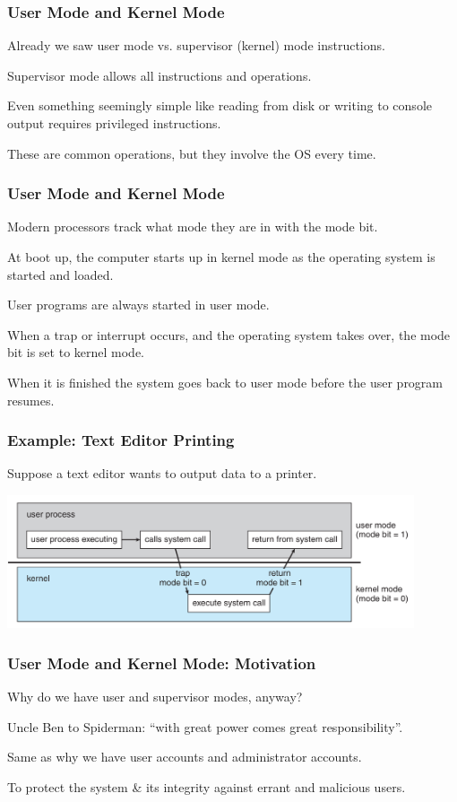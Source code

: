 \begin{frame}
\frametitle{User Mode and Kernel Mode}

Already we saw user mode vs. supervisor (kernel) mode instructions.

Supervisor mode allows all instructions and operations.

Even something seemingly simple like reading from disk or writing to console output requires privileged instructions. 

These are common operations, but they involve the OS every time.


\end{frame}

\begin{frame}
\frametitle{User Mode and Kernel Mode}

Modern processors track what mode they are in with the mode bit. 

At boot up, the computer starts up in kernel mode as the operating system is started and loaded. 

User programs are always started in user mode. 

When a trap or interrupt occurs, and the operating system takes over, the mode bit is set to kernel mode. 

When it is finished the system goes back to user mode before the user program resumes.


\end{frame}


\begin{frame}
\frametitle{Example: Text Editor Printing}

Suppose a text editor wants to output data to a printer.

\begin{center}
	\includegraphics[width=0.9\textwidth]{images/trap.png}
\end{center}

\end{frame}

\begin{frame}
\frametitle{User Mode and Kernel Mode: Motivation}

Why do we have user and supervisor modes, anyway? 

Uncle Ben to Spiderman: ``with great power comes great responsibility''. 

Same as why we have user accounts and administrator accounts. 

To protect the system \& its integrity against errant and malicious users.


\end{frame}

